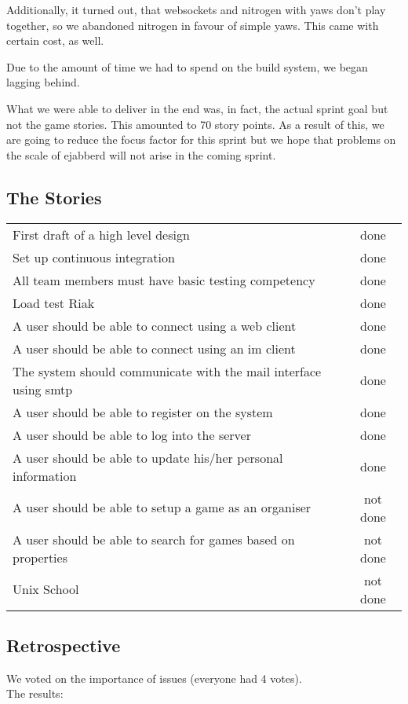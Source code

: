 \documentclass[11pt,a4paper]{article}
\begin{document}
Additionally, it turned out, that websockets and nitrogen with yaws don't play
together, so we abandoned nitrogen in favour of simple yaws. This came with 
certain cost, as well.

Due to the amount of time we had to spend on the build system, we began lagging 
behind.

What we were able to deliver in the end was, in fact, the actual sprint goal 
but not the game stories. This amounted to 70 story points. As a result of this,
we are going to reduce the focus factor for this sprint but we hope that 
problems on the scale of ejabberd will not arise in the coming sprint.

\subsection{The Stories}
\begin{tabular}{l|c}
First draft of a high level design & done \\
Set up continuous integration & done \\
All team members must have basic testing competency & done \\
Load test Riak & done \\
A user should be able to connect using a web client & done \\
A user should be able to connect using an im client & done \\
The system should communicate with the mail interface using smtp & done \\
A user should be able to register on the system & done \\
A user should be able to log into the server & done \\
A user should be able to update his/her personal information & done \\
A user should be able to setup a game as an organiser & not done \\
A user should be able to search for games based on properties & not done \\
Unix School & not done
\end{tabular}

\subsection{Retrospective}
We voted on the importance of issues (everyone had 4 votes). \\
The results:
\end{document}
